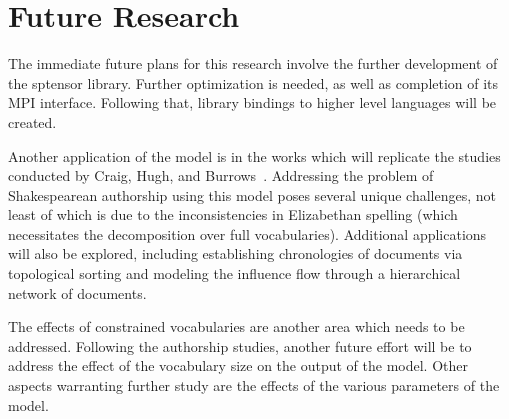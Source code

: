 \documentclass[../ut-dissertation.tex]{subfiles}
\begin{document}
\section{Future Research}
The immediate future plans for this research involve the further
development of the sptensor library.  Further optimization is needed,
as well as completion of its MPI interface.  Following that, library
bindings to higher level languages will be created.

Another application of the model is in the works which will replicate
the studies conducted by Craig, Hugh, and Burrows~\cite{burrows2017,
  craig2009}.  Addressing the problem of Shakespearean authorship
using this model poses several unique challenges, not least of which
is due to the inconsistencies in Elizabethan spelling (which
necessitates the decomposition over full vocabularies).  Additional
applications will also be explored, including establishing
chronologies of documents via topological sorting and modeling the
influence flow through a hierarchical network of documents.

The effects of constrained vocabularies are another area which needs
to be addressed.  Following the authorship studies, another future
effort will be to address the effect of the vocabulary size on the
output of the model.  Other aspects warranting further study are the
effects of the various parameters of the model.  
\end{document}
